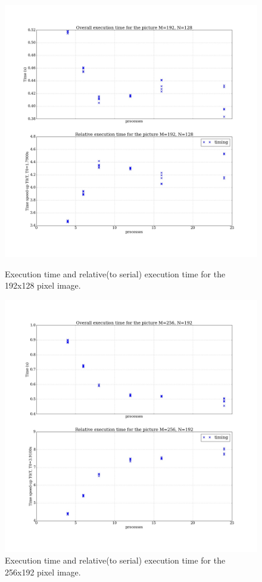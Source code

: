 \documentclass[11pt]{article}
\begin{document}
	\begin{figure}[H]	
		\centering
		\begin{minipage}[b]{.5\textwidth}
			\centering
			\includegraphics[width=\linewidth]{exec_192x128.jpeg}
			\caption{Execution time and relative(to serial) execution time for the 192x128 pixel image.}\label{exec_1}
		\end{minipage}%
		\begin{minipage}[b]{.5\textwidth}
			\centering
			\includegraphics[width=\linewidth]{exec_256x192.jpeg}
			\caption{Execution time and relative(to serial) execution time for the 256x192 pixel image.}\label{exec_2}
		\end{minipage}
	\end{figure}
	
\end{document}
